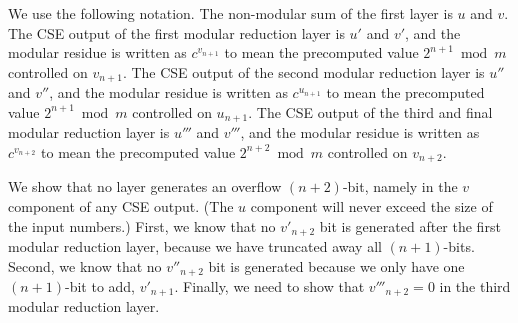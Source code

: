 \documentclass[twoside]{article}
\begin{document}
\begin{center}
\begin{figure}[h!tb]
\begin{displaymath}
\end{displaymath}
\label{fig:csa-proof}
\end{figure}
\end{center}

We use the following notation.
The non-modular sum of the first layer is $u$ and $v$.
The CSE output of the first modular reduction layer
is $u'$ and $v'$, and the modular residue is
written as $c^{v_{n+1}}$ to mean the precomputed value $2^{n+1} \bmod m$
controlled on $v_{n+1}$.
The CSE output of the second modular reduction layer
is $u''$ and $v''$, and the modular residue is written as
$c^{u_{n+1}}$ to mean the precomputed value $2^{n+1} \bmod m$
controlled on $u_{n+1}$.
The CSE output of the third and final modular reduction layer
is $u'''$ and $v'''$, and the modular residue is written as
$c^{v_{n+2}}$ to mean the precomputed value $2^{n+2} \bmod m$
controlled on $v_{n+2}$.

We show that no layer generates an overflow $(n+2)$-bit, namely in the
$v$ component of any CSE output. (The $u$ component will never exceed the
size of the input numbers.) First, we know that no $v'_{n+2}$ bit
is generated after the first modular reduction layer, because we have
truncated away all $(n+1)$-bits. Second, we know that no $v''_{n+2}$ bit is
generated because we only have one $(n+1)$-bit to add, $v'_{n+1}$.
Finally, we need to show that $v'''_{n+2} = 0$ in the third modular reduction
layer. 
\end{document}
